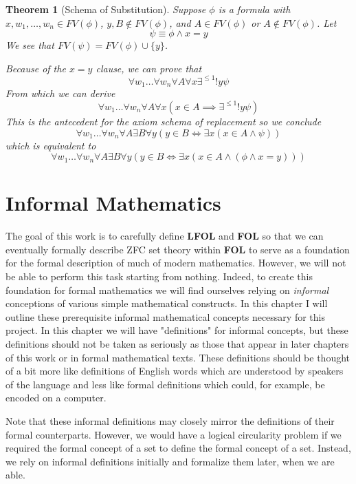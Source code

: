 \documentclass[12pt]{article}
\theoremstyle{break}
\theoremstyle{break}
\newtheorem{theorem}{Theorem}[section]
\theoremstyle{break}
\theoremstyle{break}
\theoremstyle{break}
\newtheorem{informal definition}[definition]{Informal Definition}
\begin{document}
\begin{theorem}[Schema of Substitution]
Suppose $\phi$ is a formula with $x, w_1, \ldots, w_n \in FV(\phi)$, $y, B\not \in FV(\phi)$, and $A\in FV(\phi)$ or $A\not \in FV(\phi)$.
Let
$$
\psi \equiv \phi \land x=y
$$
We see that $FV(\psi) = FV(\phi)\cup\{y\}$.

Because of the $x=y$ clause, we can prove that
$$
\forall w_1\ldots \forall w_n \forall A \forall x \exists^{\le1}!y \psi
$$
From which we can derive
$$
\forall w_1\ldots \forall w_n \forall A \forall x (x\in A \implies \exists^{\le1}!y \psi)
$$
This is the antecedent for the axiom schema of replacement so we conclude
$$
\forall w_1 \ldots \forall w_n \forall A \exists B \forall y (y\in B \iff \exists x(x\in A \land \psi))
$$
which is equivalent to
$$
\forall w_1 \ldots \forall w_n \forall A \exists B \forall y (y\in B \iff \exists x(x\in A \land (\phi \land x=y)))
$$
\end{theorem}

\section{Informal Mathematics}
The goal of this work is to carefully define \textbf{LFOL} and \textbf{FOL} so that we can eventually formally describe ZFC set theory within \textbf{FOL} to serve as a foundation for the formal description of much of modern mathematics.
However, we will not be able to perform this task starting from nothing.
Indeed, to create this foundation for formal mathematics we will find ourselves relying on \textit{informal} conceptions of various simple mathematical constructs.
In this chapter I will outline these prerequisite informal mathematical concepts necessary for this project.
In this chapter we will have "definitions" for informal concepts, but these definitions should not be taken as seriously as those that appear in later chapters of this work or in formal mathematical texts.
These definitions should be thought of a bit more like definitions of English words which are understood by speakers of the language and less like formal definitions which could, for example, be encoded on a computer.

Note that these informal definitions may closely mirror the definitions of their formal counterparts.
However, we would have a logical circularity problem if we required the formal concept of a set to define the formal concept of a set.
Instead, we rely on informal definitions initially and formalize them later, when we are able.
\end{document}
